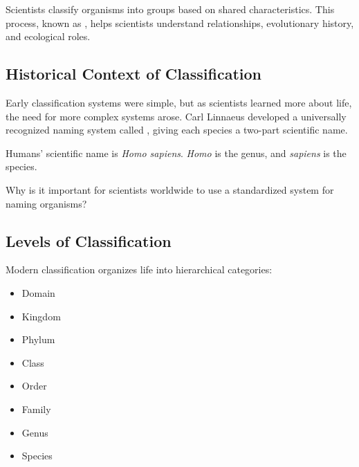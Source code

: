 Scientists classify organisms into groups based on shared characteristics. This process, known as , helps scientists understand relationships, evolutionary history, and ecological roles.

\subsection{Historical Context of Classification}


Early classification systems were simple, but as scientists learned more about life, the need for more complex systems arose. Carl Linnaeus developed a universally recognized naming system called , giving each species a two-part scientific name.

\begin{example}
Humans' scientific name is \textit{Homo sapiens}. \textit{Homo} is the genus, and \textit{sapiens} is the species.
\end{example}

\begin{stopandthink}
Why is it important for scientists worldwide to use a standardized system for naming organisms?
\end{stopandthink}

\subsection{Levels of Classification}

Modern classification organizes life into hierarchical categories:

\begin{itemize}
    \item Domain
    \item Kingdom
    \item Phylum
    \item Class
    \item Order
    \item Family
    \item Genus
    \item Species
\end{itemize}


